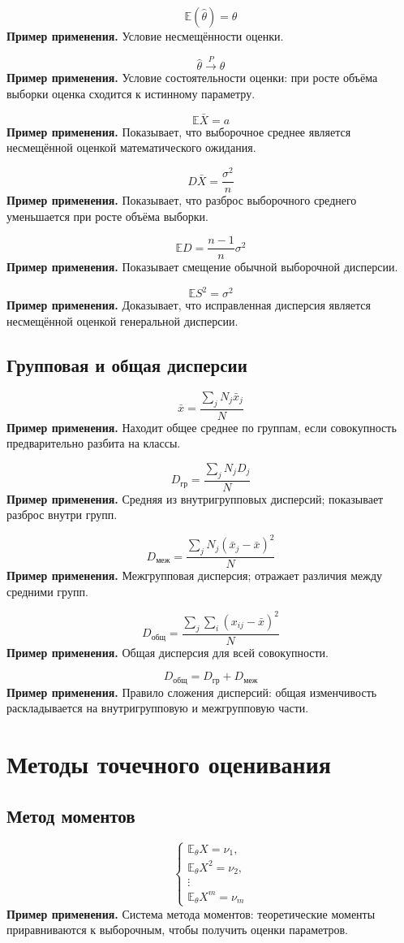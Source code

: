 \documentclass[a4paper,14pt]{extarticle}
\newcommand{\FormulaNote}[2]{%
  \begin{equation*}
  #1
  \end{equation*}
  \noindent\textbf{Пример применения.} #2\par\medskip
}
\begin{document}
\FormulaNote{\mathbb{E}(\hat{\theta})=\theta}{Условие несмещённости оценки.}

\FormulaNote{\hat{\theta}\xrightarrow{P}\theta}{Условие состоятельности оценки: при росте объёма выборки оценка сходится к истинному параметру.}

\FormulaNote{\mathbb{E}\bar{X}=a}{Показывает, что выборочное среднее является несмещённой оценкой математического ожидания.}

\FormulaNote{D\bar{X}=\frac{\sigma^2}{n}}{Показывает, что разброс выборочного среднего уменьшается при росте объёма выборки.}

\FormulaNote{\mathbb{E}D=\frac{n-1}{n}\sigma^2}{Показывает смещение обычной выборочной дисперсии.}

\FormulaNote{\mathbb{E}S^2=\sigma^2}{Доказывает, что исправленная дисперсия является несмещённой оценкой генеральной дисперсии.}

\subsection{Групповая и общая дисперсии}

\FormulaNote{\bar{x}=\frac{\sum_{j}N_j\bar{x}_j}{N}}{Находит общее среднее по группам, если совокупность предварительно разбита на классы.}

\FormulaNote{D_{\text{гр}}=\frac{\sum_{j}N_jD_j}{N}}{Средняя из внутригрупповых дисперсий; показывает разброс внутри групп.}

\FormulaNote{D_{\text{меж}}=\frac{\sum_{j}N_j(\bar{x}_j-\bar{x})^2}{N}}{Межгрупповая дисперсия; отражает различия между средними групп.}

\FormulaNote{D_{\text{общ}}=\frac{\sum_{j}\sum_{i}(x_{ij}-\bar{x})^2}{N}}{Общая дисперсия для всей совокупности.}

\FormulaNote{D_{\text{общ}}=D_{\text{гр}}+D_{\text{меж}}}{Правило сложения дисперсий: общая изменчивость раскладывается на внутригрупповую и межгрупповую части.}

\section{Методы точечного оценивания}

\subsection{Метод моментов}

\FormulaNote{
\begin{cases}
\mathbb{E}_{\theta}X=\nu_1,\\
\mathbb{E}_{\theta}X^2=\nu_2,\\
\vdots\\
\mathbb{E}_{\theta}X^m=\nu_m
\end{cases}
}{Система метода моментов: теоретические моменты приравниваются к выборочным, чтобы получить оценки параметров.}
\end{document}
